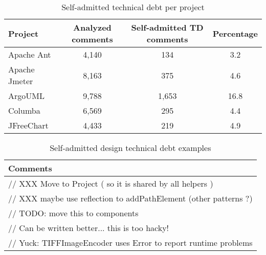 \begin{table*}[!hbt]
      \begin{center}
            \caption{Self-admitted technical debt per project}
            \label{tab:technical_debt_project}
            \begin{tabular}{l| c c c }
            \toprule
            \textbf{Project}      & \textbf{Analyzed comments}     & \textbf{Self-admitted TD comments} & \textbf{Percentage} \\ \midrule 
              Apache Ant          & 4,140                          & 134                                & 3.2  \\                                   
              Apache Jmeter       & 8,163                          & 375                                & 4.6  \\                                   
              ArgoUML             & 9,788                          & 1,653                              & 16.8 \\                                   
              Columba             & 6,569                          & 295                                & 4.4 \\                                   
              JFreeChart          & 4,433                          & 219                                & 4.9  \\ \bottomrule
            \end{tabular}
      \end{center}
\end{table*}

\begin{table}[!hbt]
      \begin{center}
            \caption{Self-admitted design technical debt examples}
            \label{tab:design_debt_detail}
            \begin{tabular}{l}
            \toprule
            \textbf{Comments}     \\ \midrule 
             // XXX Move to Project ( so it is shared by all helpers ) \\                                   
             // XXX maybe use reflection to addPathElement (other patterns ?) \\                                   
             // TODO: move this to components \\                                   
             // Can be written better... this is too hacky! \\                                   
             // Yuck: TIFFImageEncoder uses Error to report runtime problems \\ \bottomrule
            \end{tabular}
      \end{center}
\end{table}

